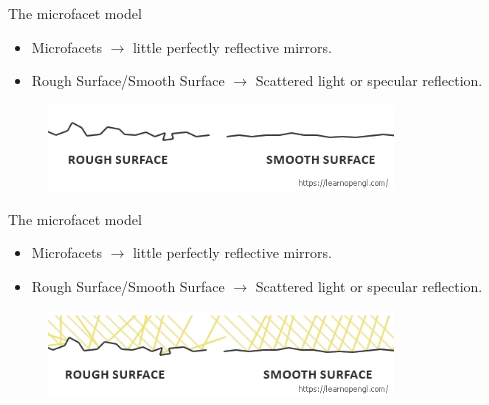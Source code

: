 \documentclass[]{beamer}
\begin{document}
\begin{frame}


  \textcolor{mypink1}{The microfacet model}
  \vspace{5mm}
 \pause

 \begin{itemize}
     \item Microfacets \pause $\rightarrow$ little perfectly reflective mirrors. \pause
     \item Rough Surface/Smooth Surface \pause $\rightarrow$ Scattered light or specular reflection.\pause 
 \end{itemize}

\pause
\vspace{5mm}

 \begin{figure}[h!]
  \begin{center}
    \includegraphics[height=0.9in]{images/13.jpg}
  \end{center}
\end{figure}




\end{frame}
  

\begin{frame}


  \textcolor{mypink1}{The microfacet model}
\vspace{5mm}

 \begin{itemize}
     \item Microfacets  $\rightarrow$ little perfectly reflective mirrors. 
     \item Rough Surface/Smooth Surface  $\rightarrow$ Scattered light or specular reflection.
 \end{itemize}


\vspace{5mm}

 \begin{figure}[h!]
  \begin{center}
    \includegraphics[height=0.9in]{images/12.jpg}
  \end{center}
\end{figure}




\end{frame}
\end{document}
